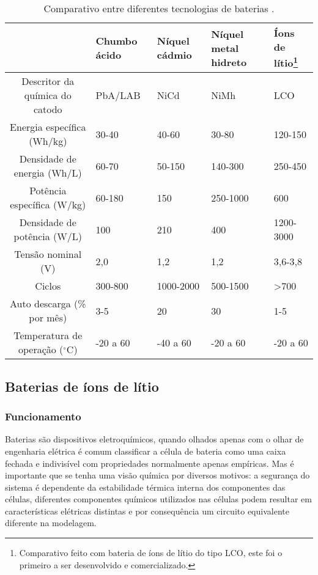       \begin{table}[!htp]
         \centering
         \caption{Comparativo entre diferentes tecnologias de baterias \cite{War15}.}
         \label{tab:bat-tecnologias}
         \begin{tabular}{c m{1.9cm} m{1.9cm} m{2.2cm} m{2.2cm}}
            \hline
            \multicolumn{1}{c}{}& Chumbo ácido & Níquel cádmio & Níquel metal hidreto & Íons de lítio\footnote{Comparativo feito com bateria de íons de lítio do tipo LCO, este foi o primeiro a ser desenvolvido e comercializado.} \\
            \hline
            Descritor da química do catodo & PbA/LAB & NiCd & NiMh & LCO \\
            Energia específica (Wh/kg) & 30-40 & 40-60 & 30-80 & 120-150 \\
            Densidade de energia (Wh/L) & 60-70 & 50-150 & 140-300 & 250-450 \\
            Potência específica (W/kg) & 60-180 & 150 & 250-1000 & 600 \\
            Densidade de potência (W/L) & 100 & 210 & 400 & 1200-3000 \\
            Tensão nominal (V) & 2,0 & 1,2 & 1,2 & 3,6-3,8 \\
            Ciclos & 300-800 & 1000-2000 & 500-1500 & >700 \\
            Auto descarga (\% por mês) & 3-5 & 20 & 30 & 1-5 \\
            Temperatura de operação ($^{\circ}$C) & -20 a 60 & -40 a 60 & -20 a 60 & -20 a 60 \\
            \hline
         \end{tabular}
      \end{table}
      
   \subsection{Baterias de íons de lítio}
      \subsubsection{Funcionamento}
         Baterias são dispositivos eletroquímicos, quando olhados apenas com o olhar de engenharia elétrica é comum classificar a célula de bateria como uma caixa fechada e indivisível com propriedades normalmente apenas empíricas. Mas é importante que se tenha uma visão química por diversos motivos: a segurança do sistema é dependente da estabilidade térmica interna dos componentes das células, diferentes componentes químicos utilizados nas células podem resultar em características elétricas distintas e por consequência um circuito equivalente diferente na modelagem. 

